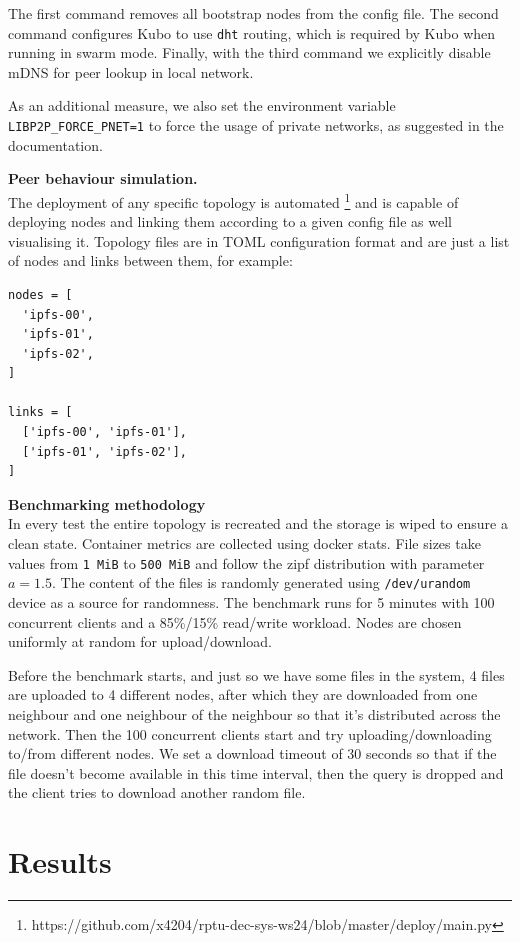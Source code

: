 The first command removes all bootstrap nodes from the config file. The second
command configures Kubo to use \verb|dht| routing, which is required by Kubo
when running in swarm mode. Finally, with the third command we explicitly
disable mDNS for peer lookup in local network.

As an additional measure, we also set the environment variable
\verb|LIBP2P_FORCE_PNET=1| to force the usage of private networks, as suggested
in the documentation.

\textbf{Peer behaviour simulation.}\\
The deployment of any specific topology is automated
\footnote{https://github.com/x4204/rptu-dec-sys-ws24/blob/master/deploy/main.py}
and is capable of deploying nodes and linking them according to a given config
file as well visualising it. Topology files are in TOML configuration format
and are just a list of nodes and links between them, for example:
\begin{lstlisting}
nodes = [
  'ipfs-00',
  'ipfs-01',
  'ipfs-02',
]

links = [
  ['ipfs-00', 'ipfs-01'],
  ['ipfs-01', 'ipfs-02'],
]
\end{lstlisting}

\textbf{Benchmarking methodology}\\
In every test the entire topology is recreated and the storage is wiped to
ensure a clean state. Container metrics are collected using docker stats. File
sizes take values from \verb|1 MiB| to \verb|500 MiB| and follow the zipf
distribution with parameter $a=1.5$. The content of the files is randomly
generated using \verb|/dev/urandom| device as a source for randomness. The
benchmark runs for 5 minutes with 100 concurrent clients and a 85\%/15\%
read/write workload. Nodes are chosen uniformly at random for upload/download.

Before the benchmark starts, and just so we have some files in the system, 4
files are uploaded to 4 different nodes, after which they are downloaded from
one neighbour and one neighbour of the neighbour so that it's distributed
across the network. Then the 100 concurrent clients start and try
uploading/downloading to/from different nodes. We set a download timeout of 30
seconds so that if the file doesn't become available in this time interval,
then the query is dropped and the client tries to download another random file.


\newpage
\section{Results}

